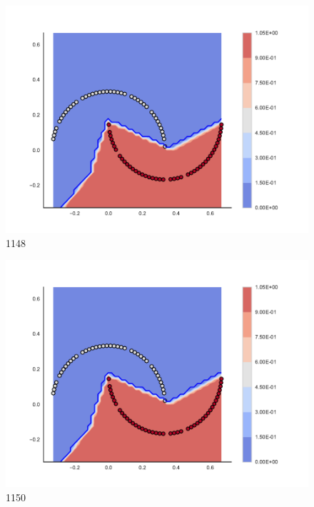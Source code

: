 \begin{subfigure}[b]{0.09\textwidth}
    \includegraphics[clip, trim=2.35cm 1.75cm 4.5cm 0cm,width=\textwidth]{img/convergence/1148.pdf}
    \caption{1148}
    \label{fig:convergence_1148}
\end{subfigure}
%
\begin{subfigure}[b]{0.09\textwidth}
    \includegraphics[clip, trim=2.35cm 1.75cm 4.5cm 0cm,width=\textwidth]{img/convergence/1150.pdf}
    \caption{1150}
    \label{fig:convergence_1150}
\end{subfigure}
%
